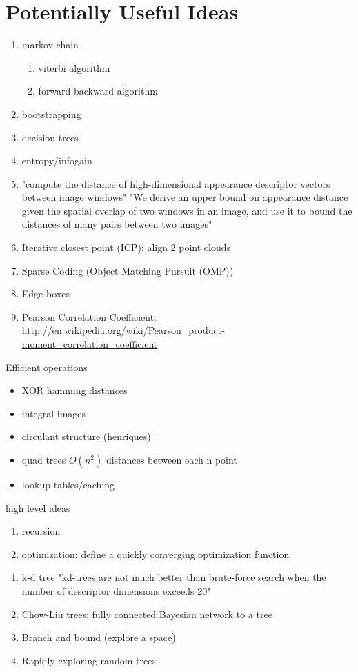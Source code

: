 \section{Potentially Useful Ideas}
\begin{enumerate}
	\item markov chain
	\begin{enumerate}
		\item viterbi algorithm
		\item forward-backward algorithm
	\end{enumerate}
	\item bootstrapping
	\item decision trees
	\item entropy/infogain
	\item "compute the distance of high-dimensional appearance descriptor vectors between image windows" "We derive an upper bound on appearance distance given the spatial overlap of two windows in an image, and use it to bound the distances of many pairs between two images" \cite{alexe2011exploiting}
	\item Iterative closest point (ICP): align 2 point clouds
    \item Sparse Coding (Object Matching Pursuit (OMP))
    \item Edge boxes \cite{zitnick2014edge}
    \item Pearson Correlation Coefficient: \url{http://en.wikipedia.org/wiki/Pearson_product-moment_correlation_coefficient}
\end{enumerate}

Efficient operations
\begin{itemize}
\item XOR hamming distances
\item integral images
\item circulant structure (henriques)
\item quad trees $O(n^2)$ distances between each n point
\item lookup tables/caching
\end{itemize}

high level ideas
\begin{enumerate}
\item recursion
\item optimization: define a quickly converging optimization function
\end{enumerate}

\begin{enumerate}
\item k-d tree "kd-trees are not much better than brute-force search when the number of descriptor dimensions exceeds 20"
\item Chow-Liu trees: fully connected Bayesian network to a tree
\item Branch and bound (explore a space)
\item Rapidly exploring random trees
\end{enumerate}


